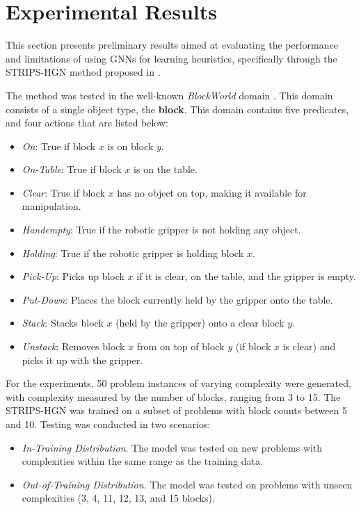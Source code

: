 \section{Experimental Results}
\label{sec:gnn_experimental_results}
This section presents preliminary results aimed at evaluating the performance and limitations of using GNNs for learning heuristics, specifically through the STRIPS-HGN method proposed in \cite{shen2020learning}.

The method was tested in the well-known \textit{BlockWorld} domain \cite{slaney2001blocks}. This domain consists of a single object type, the \textbf{block}. 
This domain contains five predicates, and four actions that are listed below: 

\begin{itemize}
    \item \textit{On}: True if block $x$ is on block $y$.
    \item \textit{On-Table}: True if block $x$ is on the table.
    \item \textit{Clear}: True if block $x$ has no object on top, making it available for manipulation.
    \item \textit{Handempty}: True if the robotic gripper is not holding any object.
    \item \textit{Holding}: True if the robotic gripper is holding block $x$.

    \item \textit{Pick-Up}: Picks up block $x$ if it is clear, on the table, and the gripper is empty.
    \item \textit{Put-Down}: Places the block currently held by the gripper onto the table.
    \item \textit{Stack}: Stacks block $x$ (held by the gripper) onto a clear block $y$.
    \item \textit{Unstack}: Removes block $x$ from on top of block $y$ (if block $x$ is clear) and picks it up with the gripper.
\end{itemize}

For the experiments, 50 problem instances of varying complexity were generated, with complexity measured by the number of blocks, ranging from 3 to 15. The STRIPS-HGN was trained on a subset of problems with block counts between 5 and 10. Testing was conducted in two scenarios:

\begin{itemize}
    \item \textit{In-Training Distribution}. The model was tested on new problems with complexities within the same range as the training data.
    \item \textit{Out-of-Training Distribution}. The model was tested on problems with unseen complexities (3, 4, 11, 12, 13, and 15 blocks).
\end{itemize}

